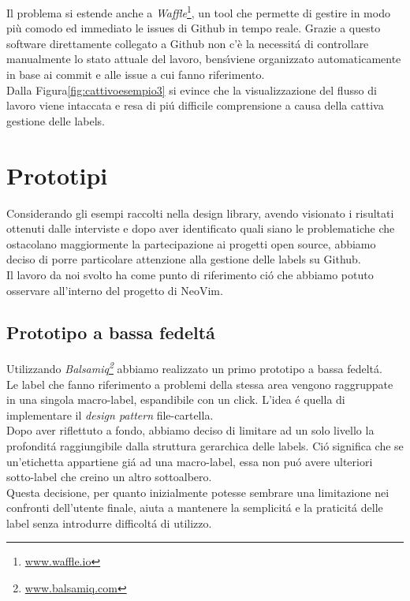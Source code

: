 \documentclass[12pt]{article} %
\begin{document}
Il problema si estende anche a \emph{Waffle}\footnote{\url{www.waffle.io}}, un tool che permette di gestire in modo pi\`u comodo ed immediato le issues di Github in tempo reale. Grazie a questo software direttamente collegato a Github non c'\`e la necessit\'a di controllare manualmente lo stato attuale del lavoro, bens\'\i viene organizzato automaticamente in base ai commit e alle issue a cui fanno riferimento.\\
Dalla Figura\ref{fig:cattivoesempio3} si evince che la visualizzazione del flusso di lavoro viene intaccata e resa di pi\'u difficile comprensione a causa della cattiva gestione delle labels.

\newpage

\section{Prototipi}
Considerando gli esempi raccolti nella design library, avendo visionato i risultati ottenuti dalle interviste e dopo aver identificato quali siano le problematiche che ostacolano maggiormente la partecipazione ai progetti open source, abbiamo deciso di porre particolare attenzione alla gestione delle labels su Github.\\
Il lavoro da noi svolto ha come punto di riferimento ci\'o che abbiamo potuto osservare all'interno del progetto di NeoVim.\\

\subsection{Prototipo a bassa fedelt\'a}
Utilizzando \emph{Balsamiq\footnote{\url{www.balsamiq.com}}} abbiamo realizzato un primo prototipo a bassa fedelt\'a.\\
Le label che fanno riferimento a problemi della stessa area vengono raggruppate in una singola macro-label, espandibile con un click. L'idea \'e quella di implementare il \emph{design pattern} file-cartella.\\
Dopo aver riflettuto a fondo, abbiamo deciso di limitare ad un solo livello la profondit\'a raggiungibile dalla struttura gerarchica delle labels. Ci\'o significa che se un'etichetta appartiene gi\'a ad una macro-label, essa non pu\'o avere ulteriori sotto-label che creino un altro sottoalbero.\\
Questa decisione, per quanto inizialmente potesse sembrare una limitazione nei confronti dell'utente finale, aiuta a mantenere la semplicit\'a e la praticit\'a delle label senza introdurre difficolt\'a di utilizzo.
\end{document}
